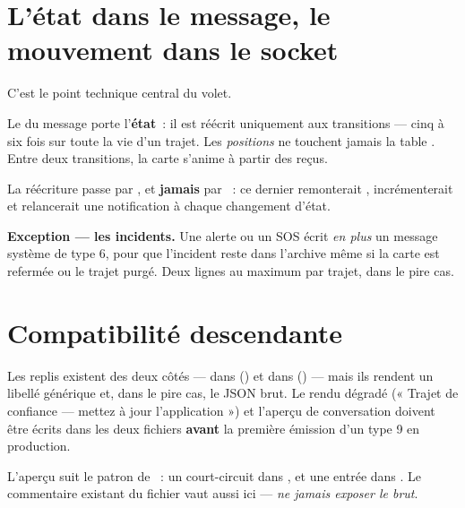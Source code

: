 \section{L'état dans le message, le mouvement dans le socket}

C'est le point technique central du volet.

\begin{note}
Le  du message porte l'\textbf{état}~: il est réécrit uniquement aux
transitions --- cinq à six fois sur toute la vie d'un trajet. Les \emph{positions} ne
touchent jamais la table . Entre deux transitions, la carte s'anime à partir
des  reçus.
\end{note}

La réécriture passe par , et \textbf{jamais} par
~: ce dernier remonterait , incrémenterait
 et relancerait une notification à chaque changement d'état.

\textbf{Exception --- les incidents.} Une alerte ou un SOS écrit \emph{en plus} un message
système de type 6, pour que l'incident reste dans l'archive même si la carte est refermée ou
le trajet purgé. Deux lignes au maximum par trajet, dans le pire cas.

\section{Compatibilité descendante}

\begin{alerte}
Les replis existent des deux côtés ---  dans 
() et
 dans 
() --- mais ils rendent un libellé générique et, dans le
pire cas, le JSON brut. Le rendu dégradé (« Trajet de confiance --- mettez à jour
l'application ») et l'aperçu de conversation doivent être écrits dans les deux fichiers
\textbf{avant} la première émission d'un type 9 en production.
\end{alerte}

L'aperçu suit le patron de ~: un court-circuit
 dans , et une entrée dans . Le
commentaire existant du fichier vaut aussi ici --- \emph{ne jamais exposer le
 brut}.

